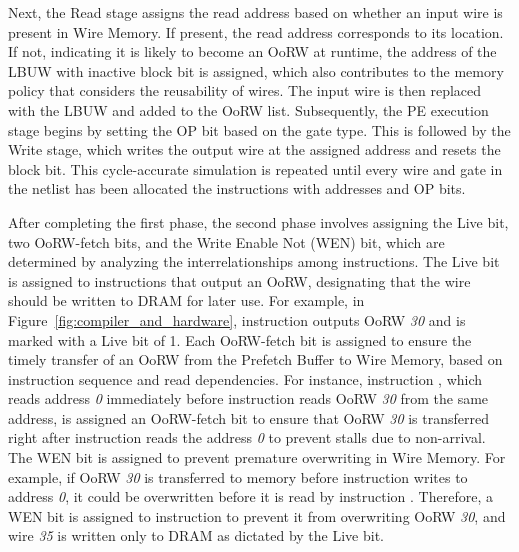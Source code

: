 
Next, the Read stage assigns the read address based on whether an input wire is present in Wire Memory. If present, the read address corresponds to its location. If not, indicating it is likely to become an OoRW at runtime, the address of the LBUW with inactive block bit is assigned, which also contributes to the memory policy that considers the reusability of wires. The input wire is then replaced with the LBUW and added to the OoRW list. Subsequently, the PE execution stage begins by setting the OP bit based on the gate type. This is followed by the Write stage, which writes the output wire at the assigned address and resets the block bit. This cycle-accurate simulation is repeated until every wire and gate in the netlist has been allocated the instructions with addresses and OP bits.

After completing the first phase, the second phase involves assigning the Live bit, two OoRW-fetch bits, and the Write Enable Not (WEN) bit, which are determined by analyzing the interrelationships among instructions. The Live bit is assigned to instructions that output an OoRW, designating that the wire should be written to DRAM for later use. For example, in Figure~\ref{fig:compiler_and_hardware}, instruction  outputs OoRW \textit{30} and is marked with a Live bit of 1.
Each OoRW-fetch bit is assigned to ensure the timely transfer of an OoRW from the Prefetch Buffer to Wire Memory, based on instruction sequence and read dependencies.
For instance, instruction , which reads address \textit{0} immediately before instruction  reads OoRW \textit{30} from the same address, is assigned an OoRW-fetch bit to ensure that OoRW \textit{30} is transferred right after instruction  reads the address \textit{0} to prevent stalls due to non-arrival.
The WEN bit is assigned to prevent premature overwriting in Wire Memory.
For example, if OoRW \textit{30} is transferred to memory before instruction  writes to address \textit{0}, it could be overwritten before it is read by instruction . Therefore, a WEN bit is assigned to instruction  to prevent it from overwriting OoRW \textit{30}, and wire \textit{35} is written only to DRAM as dictated by the Live bit.


